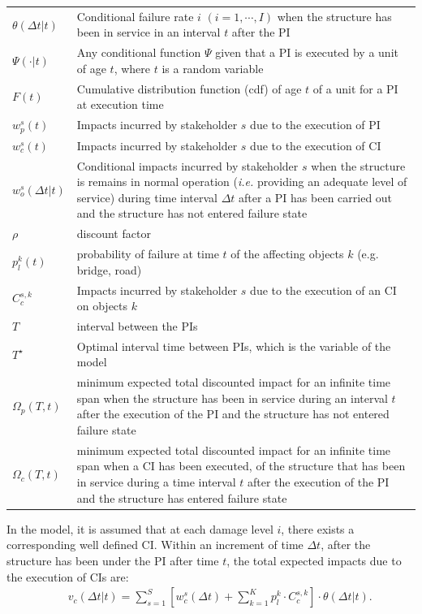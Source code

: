 \documentclass[fleqn]{article}
\begin{document}
\begin{tabular}{lp{12.5cm}}
$\theta(\Delta t|t)$ & Conditional failure rate $i$ $(i=1,\cdots,I)$ when the structure has been in service in an interval $t$ after the PI \\ 
$\Psi(\cdot|t)$ & Any conditional function $\Psi$ given that a PI is executed by a unit of age $t$, where $t$ is a random variable \\ 
$F(t)$ & Cumulative distribution function (cdf) of age $t$ of a unit for a PI at execution time\\ 
$w_{p}^s(t)$ & Impacts incurred by stakeholder $s$ due to the execution of PI\\ 
$w_{c}^s(t)$ & Impacts incurred by stakeholder $s$ due to the execution of CI \\ 
$w_o^s(\Delta t|t)$ & Conditional impacts incurred by stakeholder $s$ when the structure is remains in normal operation (\emph{i.e.} providing an adequate level of service) during time interval $\Delta t$ after a PI has been carried out and the structure has not entered failure state\\ 
$\rho$ & discount factor\\
$p_l^k (t)$ & probability of failure at time $t$ of the affecting objects $k$ (e.g. bridge, road)\\
$C_c^{s,k}$ & Impacts incurred by stakeholder $s$ due to the execution of an CI on objects $k$ \\
$T$ & interval between the PIs\\ 
$T^{\star}$ & Optimal interval time between PIs, which is the variable of the model\\
$\Omega_{p}(T,t)$ & minimum expected total discounted impact for an infinite time span when the structure has been in service during an interval $t$ after the execution of the PI and the structure has not entered failure state\\
$\Omega_{c}(T,t)$ & minimum expected total discounted impact for an infinite time span when a CI has been executed, of the structure that has been in service during a time interval $t$ after the execution of the PI and the structure has entered failure state\\
\end{tabular}
In the model, it is assumed that at each damage level $i$, there exists a corresponding well defined CI. Within an increment of time $\Delta t$, after the structure has been under the PI after time $t$, the total expected impacts due to the execution of CIs are:
\begin{eqnarray}
&& v_c (\Delta t|t) =\sum_{s=1}^{S} \left [ w_{c}^s  (\Delta t) + \sum_{k=1}^K p_l^k \cdot C_c^{s,k} \right ] \cdot \theta (\Delta t|t) .\label{totalCIs}
\end{eqnarray}
\end{document}
